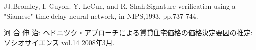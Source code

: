 \footnotesize{

\begin{thebibliography}{*}

 JJ.Bromley, I. Guyon. Y. LeCun, and R. Shah:Signature verification using a "Siamese" time delay neural network, in NIPS,1993, pp.737-744.

 河 合 伸 治: へドニツク・アプローチによる賃貸住宅価格の価格決定要因の推定: ソシオサイエンス vol.14 2008年3月.

\end{thebibliography}

}